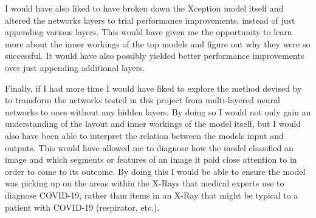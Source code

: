 I would have also liked to have broken down the Xception model itself and altered the networks layers to trial performance improvements, instead of just appending various layers. This would have given me the opportunity to learn more about the inner workings of the top models and figure out why they were so successful. It would have also possibly yielded better performance improvements over just appending additional layers.

Finally, if I had more time I would have liked to explore the method devised by \cite{kamimura2019neural} to transform the networks tested in this project from multi-layered neural networks to ones without any hidden layers. By doing so I would not only gain an understanding of the layout and inner workings of the model itself, but I would also have been able to interpret the relation between the models input and outputs. This would have allowed me to diagnose how the model classified an image and which segments or features of an image it paid close attention to in order to come to its outcome. By doing this I would be able to ensure the model was picking up on the areas within the X-Rays that medical experts use to diagnose COVID-19, rather than items in an X-Ray that might be typical to a patient with COVID-19 (respirator, etc.).